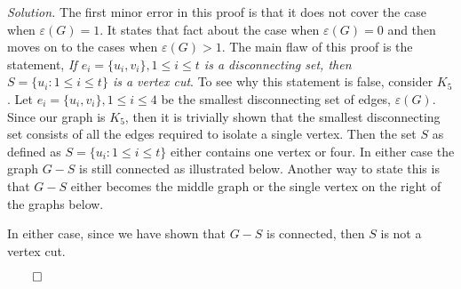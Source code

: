 \documentclass{article}
\begin{document}
\textit{Solution.} The first minor error in this proof is that it does not cover the case when \(\varepsilon(G)=1\). It states that fact about the case when \(\varepsilon(G) = 0\) and then moves on to the cases when \(\varepsilon(G)>1\). The main flaw of this proof is the statement, \textit{If \(e_i=\{u_i,v_i\},1\leq i \leq t\) is a disconnecting set, then \(S=\{u_i :1\leq i\leq t\}\) is a vertex cut}. To see why this statement is false, consider \(K_5\). Let \(e_i=\{u_i,v_i\},1\leq i \leq 4\) be the smallest disconnecting set of edges, \(\varepsilon(G)\). Since our graph is \(K_5\), then it is trivially shown that the smallest disconnecting set consists of all the edges required to isolate a single vertex.  Then the set \(S\) as defined as \(S=\{u_i :1\leq i\leq t\}\) either contains one vertex or four. In either case the graph \(G-S\) is still connected as illustrated below. Another way to state this is that \(G-S\) either becomes the middle graph or the single vertex on the right of the graphs below. 
\begin{center}
\hspace{9mm}
\hspace{9mm}
\hspace{6mm}
 \end{center}
In either case, since we have shown that \(G-S\) is connected, then \(S\) is not a vertex cut.
\begin{flushright}
 \(\qed\) 
\end{flushright}
\end{document}
